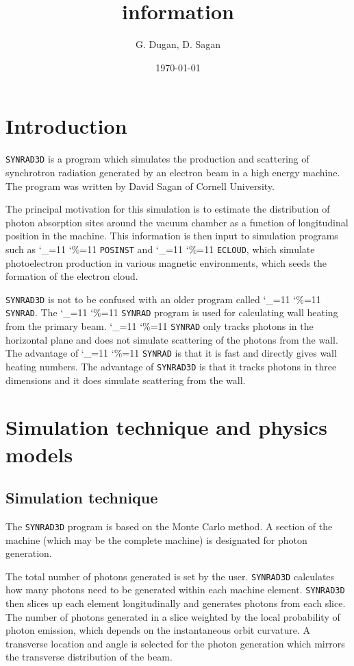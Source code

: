 \documentclass[11pt]{article}
\title{ \srthree information}
\author{G. Dugan, D. Sagan}
\date{\today}                                      %
\newcommand{\srthree}{\texttt{SYNRAD3D}\xspace}
\newcommand\ttcmd{\begingroup\catcode`\_=11 \catcode`\%=11 \dottcmd}
\newcommand\dottcmd[1]{\texttt{#1}\endgroup}
\newcommand{\vn}{\ttcmd}
\begin{document}
\maketitle

\section{Introduction} 

\srthree is a program which simulates
the production and scattering of synchrotron radiation generated by an
electron beam in a high energy machine. The program was written by David
Sagan of Cornell University.

The principal motivation for this simulation is to estimate the
distribution of photon absorption sites around the vacuum chamber as a
function of longitudinal position in the machine. This information is
then input to simulation programs such as \vn{POSINST} and
\vn{ECLOUD}, which simulate photoelectron production in various
magnetic environments, which seeds the formation of the electron
cloud.

\srthree is not to be confused with an older program called
\vn{SYNRAD}. The \vn{SYNRAD} program is used for calculating
wall heating from the primary beam.  \vn{SYNRAD} only tracks
photons in the horizontal plane and does not simulate scattering of
the photons from the wall. The advantage of \vn{SYNRAD} is that it
is fast and directly gives wall heating numbers. The advantage of
\srthree is that it tracks photons in three dimensions and it does
simulate scattering from the wall.

\section{Simulation technique and physics models}
\subsection{Simulation technique} 

The \srthree program is based on the Monte
Carlo method. A section of the machine (which may be the complete machine)
is designated for photon generation.

The total number of photons generated is set by the user. \srthree
calculates how many photons need to be generated within each machine
element. \srthree then slices up each element longitudinally and
generates photons from each slice. The number of photons generated in
a slice weighted by the local probability of photon emission, which
depends on the instantaneous orbit curvature. A transverse location
and angle is selected for the photon generation which mirrors the
transverse distribution of the beam.
\end{document}
